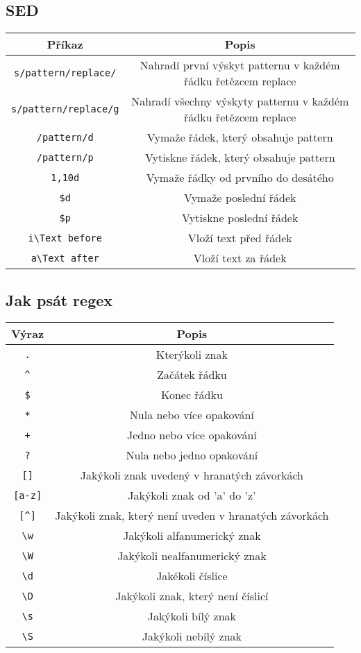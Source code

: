 \documentclass{article}
\begin{document}
\subsection{SED}
\begin{center}
\begin{tabular}{|c|c|}
\hline
\textbf{Příkaz} & \textbf{Popis} \\
\hline
\texttt{s/pattern/replace/} & Nahradí první výskyt patternu v každém řádku řetězcem replace \\
\hline
\texttt{s/pattern/replace/g} & Nahradí všechny výskyty patternu v každém řádku řetězcem replace \\
\hline
\texttt{/pattern/d} & Vymaže řádek, který obsahuje pattern \\
\hline
\texttt{/pattern/p} & Vytiskne řádek, který obsahuje pattern \\
\hline
\texttt{1,10d} & Vymaže řádky od prvního do desátého \\
\hline
\texttt{\$d} & Vymaže poslední řádek \\
\hline
\texttt{\$p} & Vytiskne poslední řádek \\
\hline
\texttt{i\textbackslash{}Text before} & Vloží text před řádek \\
\hline
\texttt{a\textbackslash{}Text after} & Vloží text za řádek \\
\hline
\end{tabular}
\end{center}
\subsection{Jak psát regex}
\begin{center}
\begin{tabular}{|c|c|}
\hline
\textbf{Výraz} & \textbf{Popis} \\
\hline
\texttt{.} & Kterýkoli znak \\
\texttt{\^} & Začátek řádku \\
\texttt{\$} & Konec řádku \\
\texttt{*} & Nula nebo více opakování \\
\texttt{+} & Jedno nebo více opakování \\
\texttt{?} & Nula nebo jedno opakování \\
\texttt{[]} & Jakýkoli znak uvedený v hranatých závorkách \\
\texttt{[a-z]} & Jakýkoli znak od 'a' do 'z' \\
\texttt{[\^{}]} & Jakýkoli znak, který není uveden v hranatých závorkách \\
\texttt{\textbackslash{}w} & Jakýkoli alfanumerický znak \\
\texttt{\textbackslash{}W} & Jakýkoli nealfanumerický znak \\
\texttt{\textbackslash{}d} & Jakékoli číslice \\
\texttt{\textbackslash{}D} & Jakýkoli znak, který není číslicí \\
\texttt{\textbackslash{}s} & Jakýkoli bílý znak \\
\texttt{\textbackslash{}S} & Jakýkoli nebílý znak \\
\hline
\end{tabular}
\end{center}
\end{document}
